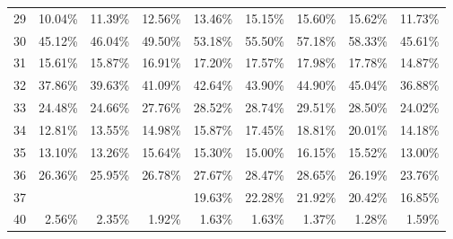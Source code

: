\begin{table}[]
\begin{center}
\begin{tabular}{crrrrrrrr}
29    & 10.04\%                  & 11.39\%                  & 12.56\%                  & 13.46\%                  & 15.15\%                  & 15.60\%                  & 15.62\%                  & 11.73\%                     \\
30    & 45.12\%                  & 46.04\%                  & 49.50\%                  & 53.18\%                  & 55.50\%                  & 57.18\%                  & 58.33\%                  & 45.61\%                     \\
31    & 15.61\%                  & 15.87\%                  & 16.91\%                  & 17.20\%                  & 17.57\%                  & 17.98\%                  & 17.78\%                  & 14.87\%                     \\
32    & 37.86\%                  & 39.63\%                  & 41.09\%                  & 42.64\%                  & 43.90\%                  & 44.90\%                  & 45.04\%                  & 36.88\%                     \\
33    & 24.48\%                  & 24.66\%                  & 27.76\%                  & 28.52\%                  & 28.74\%                  & 29.51\%                  & 28.50\%                  & 24.02\%                     \\
34    & 12.81\%                  & 13.55\%                  & 14.98\%                  & 15.87\%                  & 17.45\%                  & 18.81\%                  & 20.01\%                  & 14.18\%                     \\
35    & 13.10\%                  & 13.26\%                  & 15.64\%                  & 15.30\%                  & 15.00\%                  & 16.15\%                  & 15.52\%                  & 13.00\%                     \\
36    & 26.36\%                  & 25.95\%                  & 26.78\%                  & 27.67\%                  & 28.47\%                  & 28.65\%                  & 26.19\%                  & 23.76\%                     \\
37    &                          &                          &                          & 19.63\%                  & 22.28\%                  & 21.92\%                  & 20.42\%                  & 16.85\%                     \\
40    & 2.56\%                   & 2.35\%                   & 1.92\%                   & 1.63\%                   & 1.63\%                   & 1.37\%                   & 1.28\%                   & 1.59\%                      \\

\end{tabular}
\end{center}
\end{table}
